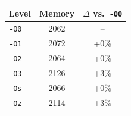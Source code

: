 \begin{tabular*}{\columnwidth}{@{\extracolsep\fill}lcc@{\extracolsep\fill}}
\toprule
\textbf{Level} & \textbf{Memory} & \textbf{$\Delta$ vs.\ \texttt{-O0}} \\
\midrule
\texttt{-O0} & 2062 & -- \\
\texttt{-O1} & 2072 & +0\% \\
\texttt{-O2} & 2064 & +0\% \\
\texttt{-O3} & 2126 & +3\% \\
\texttt{-Os} & 2066 & +0\% \\
\texttt{-Oz} & 2114 & +3\% \\
\bottomrule
\end{tabular*}
